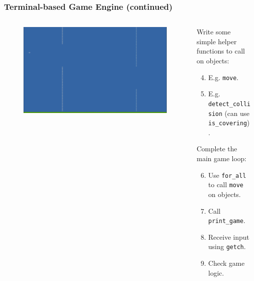 \documentclass{beamer}
\begin{document}
\begin{frame}
\frametitle{Terminal-based Game Engine (continued)}
\begin{columns}
	\begin{column}{0.55\textwidth}
		\begin{figure}
			\includegraphics[width=\textwidth]{Presentation/flappy.png}
		\end{figure}
	\end{column}
	\begin{column}{0.45\textwidth}
		Write some simple helper functions to call on objects:
		\begin{enumerate}
			\setcounter{enumi}{3}
			\item E.g. \texttt{move}.
			\item E.g. \texttt{detect\_collision} (can use \texttt{is\_covering}).
		\end{enumerate}
		Complete the main game loop:
		\begin{enumerate}
			\setcounter{enumi}{5}
			\item Use \texttt{for\_all} to call \texttt{move} on objects.
			\item Call \texttt{print\_game}.
			\item Receive input using \texttt{getch}.
			\item Check game logic.
		\end{enumerate}
	\end{column}
\end{columns}
\end{frame}
\end{document}
